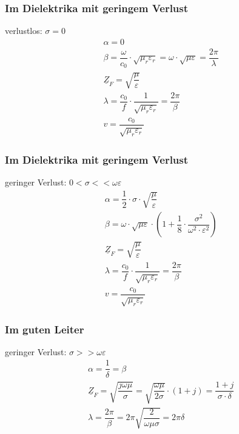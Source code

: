 \subsubsection{Im Dielektrika mit geringem Verlust}
verlustlos: $\sigma =0$
\begin{align*}
     & \alpha = 0                                                                                                       \\
     & \beta = \dfrac{\omega}{c_0}\cdot\sqrt{\mu_r\varepsilon_r}=\omega\cdot\sqrt{\mu\varepsilon}=\dfrac{2\pi}{\lambda} \\
     & \underline{Z}_F = \sqrt{\dfrac{\mu}{\varepsilon}}                                                                \\
     & \lambda = \dfrac{c_0}{f}\cdot\dfrac{1}{\sqrt{\mu_r\varepsilon_r}}=\dfrac{2\pi}{\beta}                            \\
     & v = \dfrac{c_0}{\sqrt{\mu_r\varepsilon_r}}
\end{align*}

\subsubsection{Im Dielektrika mit geringem Verlust}
geringer Verlust: $0 < \sigma <<\omega\varepsilon$
\begin{align*}
     & \alpha = \dfrac{1}{2}\cdot\sigma\cdot\sqrt{\dfrac{\mu}{\varepsilon}}                                                      \\
     & \beta = \omega\cdot\sqrt{\mu\varepsilon}\cdot\left(1+\dfrac{1}{8}\cdot\dfrac{\sigma^2}{\omega^2\cdot\varepsilon^2}\right) \\
     & \underline{Z}_F = \sqrt{\dfrac{\mu}{\varepsilon}}                                                                         \\
     & \lambda = \dfrac{c_0}{f}\cdot\dfrac{1}{\sqrt{\mu_r\varepsilon_r}}=\dfrac{2\pi}{\beta}                                     \\
     & v = \dfrac{c_0}{\sqrt{\mu_r\varepsilon_r}}
\end{align*}

\subsubsection{Im guten Leiter}
geringer Verlust: $\sigma >>\omega\varepsilon$
\begin{align*}
     & \alpha = \dfrac{1}{\delta}= \beta                                                                                                           \\
     & \underline{Z}_F = \sqrt{\dfrac{j\omega\mu}{\sigma}} = \sqrt{\dfrac{\omega\mu}{2\sigma}}\cdot\left(1+j\right)=\dfrac{1+j}{\sigma\cdot\delta} \\
     & \lambda = \dfrac{2\pi}{\beta} = 2\pi \sqrt{\dfrac{2}{\omega\mu\sigma}}=2\pi\delta                                                           \\
\end{align*}

